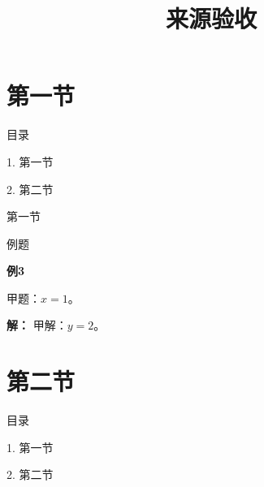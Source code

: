 \documentclass[aspectratio=169,10pt,fontset=fandol]{ctexbeamer}
\title{来源验收}
\begin{document}
\section{第一节}
\begin{frame}[t,fragile]{目录}
\normalsize
{\color{blue}\normalsize 1. 第一节\par}\vspace{0.22em}
{\color{gray!40}\normalsize 2. 第二节\par}\vspace{0.22em}
\end{frame}
\begin{frame}[t,fragile]{第一节}
\normalsize
\begin{block}{例题}
{\normalsize
\textbf{例3}\par
甲题：$x=1$。
}
\end{block}
\pause
{\normalsize
\textbf{解：}
甲解：$y=2$。
}
\end{frame}
\section{第二节}
\begin{frame}[t,fragile]{目录}
\normalsize
{\color{black}\normalsize 1. 第一节\par}\vspace{0.22em}
{\color{blue}\normalsize 2. 第二节\par}\vspace{0.22em}
\end{frame}
\end{document}
